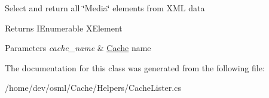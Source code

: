 Select and return all \char`\"{}\+Media\char`\"{} elements from X\+ML data 

\begin{DoxyReturn}{Returns}
I\+Enumerable X\+Element 
\end{DoxyReturn}

\begin{DoxyParams}{Parameters}
{\em cache\+\_\+name} & \mbox{\hyperlink{namespaceOSML_1_1Cache}{Cache}} name\\
\hline
\end{DoxyParams}


The documentation for this class was generated from the following file\+:\begin{DoxyCompactItemize}
\item 
/home/dev/osml/\+Cache/\+Helpers/Cache\+Lister.\+cs\end{DoxyCompactItemize}

